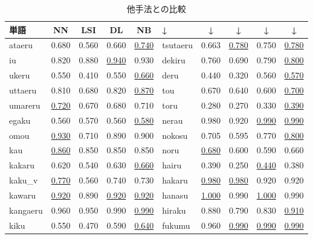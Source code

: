 \begin{table}[htbp]
  \begin{center}
    \leavevmode
    \caption{他手法との比較}\label{result2}
    \begin{tabular}{|p{}|c|c|c|c||p{}|c|c|c|c|} \hline
    単語   & NN       &  LSI   & DL & NB   & ↓ & ↓  & ↓  & ↓ & ↓ \\ \hline
ataeru     & 0.680   & 0.560 & 0.660   &  \underline{0.740}     & tsutaeru   & 0.663   & \underline{0.780} & 0.750  & \underline{0.780}      \\
iu         & 0.820   & 0.880 & \underline{0.940}   &  0.930     & dekiru     & 0.760   & 0.690 & 0.790  & \underline{0.800}      \\
ukeru      & 0.550   & 0.410 & 0.550   &  \underline{0.660}     & deru       & 0.440   & 0.320 & 0.560  & \underline{0.570}      \\
uttaeru    & 0.810   & 0.680 & 0.820   &  \underline{0.870}     & tou        & 0.670   & 0.640 & 0.600  & \underline{0.700}      \\
umareru    & \underline{0.720}   & 0.670 & 0.680   &  0.710     & toru       & 0.280   & 0.270 & 0.330  & \underline{0.390}      \\
egaku      & 0.560   & 0.570 & 0.560   &  \underline{0.580}     & nerau      & 0.980   & 0.920 & \underline{0.990}  & \underline{0.990}      \\
omou       & \underline{0.930}   & 0.710 & 0.890   &  0.900     & nokosu     & 0.705   & 0.595 & 0.770  & \underline{0.800}      \\
kau        & \underline{0.860}   & 0.850 & 0.850   &  0.850     & noru       & \underline{0.680}   & 0.600 & 0.590  & 0.660      \\
kakaru     & 0.620   & 0.540 & 0.630   &  \underline{0.660}     & hairu      & 0.390   & 0.250 & \underline{0.440}  & 0.380      \\
kaku\_v    & \underline{0.770}   & 0.560 & 0.740   &  0.730     & hakaru     & \underline{0.980}   & \underline{0.980} & 0.920  & 0.920      \\
kawaru     & \underline{0.920}   & 0.890 & \underline{0.920}   &  \underline{0.920}     & hanasu     & \underline{1.000}   & 0.990 & \underline{1.000}  & 0.990      \\
kangaeru   & 0.960   & 0.950 & 0.990   &  \underline{0.990}     & hiraku     & 0.880   & 0.790 & 0.830  & \underline{0.910}      \\
kiku       & 0.550   & 0.470 & 0.590   &  \underline{0.640}     & fukumu     & 0.960   & \underline{0.990} & \underline{0.990}  & \underline{0.990}      \\

\end{tabular}
\end{center}
\end{table}
